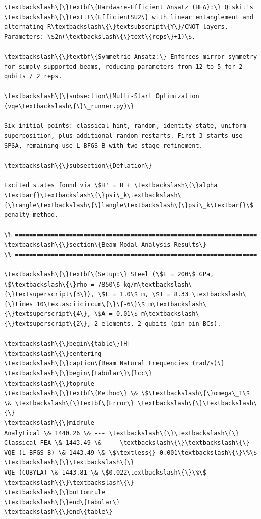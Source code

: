 \documentclass[12pt, a4paper]{article}
\begin{document}
\begin{lstlisting}[style=codestyle, caption={VQA\_Modal\_Analysis\_Report.tex}]
\textbackslash\{\}textbf\{Hardware-Efficient Ansatz (HEA):\} Qiskit's \textbackslash\{\}texttt\{EfficientSU2\} with linear entanglement and alternating R\textbackslash\{\}textsubscript\{Y\}/CNOT layers. Parameters: \$2n(\textbackslash\{\}text\{reps\}+1)\$.

\textbackslash\{\}textbf\{Symmetric Ansatz:\} Enforces mirror symmetry for simply-supported beams, reducing parameters from 12 to 5 for 2 qubits / 2 reps.

\textbackslash\{\}subsection\{Multi-Start Optimization (vqe\textbackslash\{\}\_runner.py)\}

Six initial points: classical hint, random, identity state, uniform superposition, plus additional random restarts. First 3 starts use SPSA, remaining use L-BFGS-B with two-stage refinement.

\textbackslash\{\}subsection\{Deflation\}

Excited states found via \$H' = H + \textbackslash\{\}alpha \textbar{}\textbackslash\{\}psi\_k\textbackslash\{\}rangle\textbackslash\{\}langle\textbackslash\{\}psi\_k\textbar{}\$ penalty method.

\% ===================================================================
\textbackslash\{\}section\{Beam Modal Analysis Results\}
\% ===================================================================

\textbackslash\{\}textbf\{Setup:\} Steel (\$E = 200\$ GPa, \$\textbackslash\{\}rho = 7850\$ kg/m\textbackslash\{\}textsuperscript\{3\}), \$L = 1.0\$ m, \$I = 8.33 \textbackslash\{\}times 10\textasciicircum\{\}\{-6\}\$ m\textbackslash\{\}textsuperscript\{4\}, \$A = 0.01\$ m\textbackslash\{\}textsuperscript\{2\}, 2 elements, 2 qubits (pin-pin BCs).

\textbackslash\{\}begin\{table\}[H]
\textbackslash\{\}centering
\textbackslash\{\}caption\{Beam Natural Frequencies (rad/s)\}
\textbackslash\{\}begin\{tabular\}\{lcc\}
\textbackslash\{\}toprule
\textbackslash\{\}textbf\{Method\} \& \$\textbackslash\{\}omega\_1\$ \& \textbackslash\{\}textbf\{Error\} \textbackslash\{\}\textbackslash\{\}
\textbackslash\{\}midrule
Analytical \& 1440.26 \& --- \textbackslash\{\}\textbackslash\{\}
Classical FEA \& 1443.49 \& --- \textbackslash\{\}\textbackslash\{\}
VQE (L-BFGS-B) \& 1443.49 \& \$\textless{} 0.001\textbackslash\{\}\%\$ \textbackslash\{\}\textbackslash\{\}
VQE (COBYLA) \& 1443.81 \& \$0.022\textbackslash\{\}\%\$ \textbackslash\{\}\textbackslash\{\}
\textbackslash\{\}bottomrule
\textbackslash\{\}end\{tabular\}
\textbackslash\{\}end\{table\}


\end{lstlisting}
\end{document}
